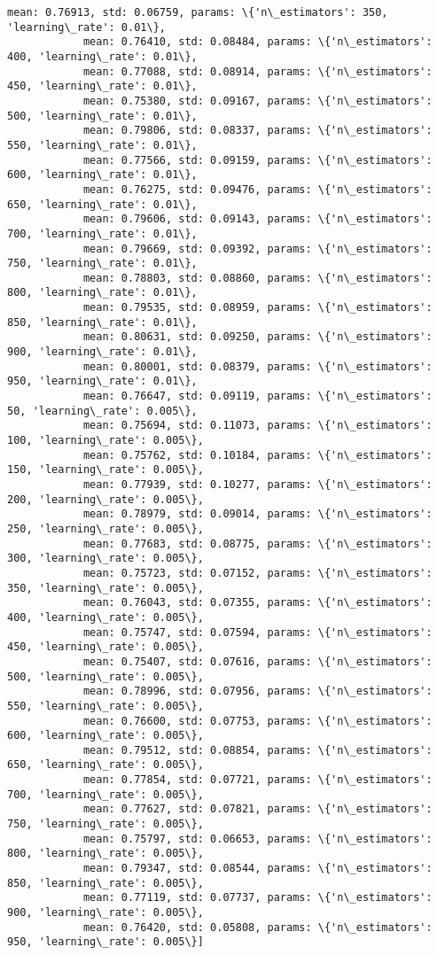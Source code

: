 \documentclass{article}
\begin{document}
\begin{Verbatim}[commandchars=\\\{\}]
            mean: 0.76913, std: 0.06759, params: \{'n\_estimators': 350, 'learning\_rate': 0.01\},
            mean: 0.76410, std: 0.08484, params: \{'n\_estimators': 400, 'learning\_rate': 0.01\},
            mean: 0.77088, std: 0.08914, params: \{'n\_estimators': 450, 'learning\_rate': 0.01\},
            mean: 0.75380, std: 0.09167, params: \{'n\_estimators': 500, 'learning\_rate': 0.01\},
            mean: 0.79806, std: 0.08337, params: \{'n\_estimators': 550, 'learning\_rate': 0.01\},
            mean: 0.77566, std: 0.09159, params: \{'n\_estimators': 600, 'learning\_rate': 0.01\},
            mean: 0.76275, std: 0.09476, params: \{'n\_estimators': 650, 'learning\_rate': 0.01\},
            mean: 0.79606, std: 0.09143, params: \{'n\_estimators': 700, 'learning\_rate': 0.01\},
            mean: 0.79669, std: 0.09392, params: \{'n\_estimators': 750, 'learning\_rate': 0.01\},
            mean: 0.78803, std: 0.08860, params: \{'n\_estimators': 800, 'learning\_rate': 0.01\},
            mean: 0.79535, std: 0.08959, params: \{'n\_estimators': 850, 'learning\_rate': 0.01\},
            mean: 0.80631, std: 0.09250, params: \{'n\_estimators': 900, 'learning\_rate': 0.01\},
            mean: 0.80001, std: 0.08379, params: \{'n\_estimators': 950, 'learning\_rate': 0.01\},
            mean: 0.76647, std: 0.09119, params: \{'n\_estimators': 50, 'learning\_rate': 0.005\},
            mean: 0.75694, std: 0.11073, params: \{'n\_estimators': 100, 'learning\_rate': 0.005\},
            mean: 0.75762, std: 0.10184, params: \{'n\_estimators': 150, 'learning\_rate': 0.005\},
            mean: 0.77939, std: 0.10277, params: \{'n\_estimators': 200, 'learning\_rate': 0.005\},
            mean: 0.78979, std: 0.09014, params: \{'n\_estimators': 250, 'learning\_rate': 0.005\},
            mean: 0.77683, std: 0.08775, params: \{'n\_estimators': 300, 'learning\_rate': 0.005\},
            mean: 0.75723, std: 0.07152, params: \{'n\_estimators': 350, 'learning\_rate': 0.005\},
            mean: 0.76043, std: 0.07355, params: \{'n\_estimators': 400, 'learning\_rate': 0.005\},
            mean: 0.75747, std: 0.07594, params: \{'n\_estimators': 450, 'learning\_rate': 0.005\},
            mean: 0.75407, std: 0.07616, params: \{'n\_estimators': 500, 'learning\_rate': 0.005\},
            mean: 0.78996, std: 0.07956, params: \{'n\_estimators': 550, 'learning\_rate': 0.005\},
            mean: 0.76600, std: 0.07753, params: \{'n\_estimators': 600, 'learning\_rate': 0.005\},
            mean: 0.79512, std: 0.08854, params: \{'n\_estimators': 650, 'learning\_rate': 0.005\},
            mean: 0.77854, std: 0.07721, params: \{'n\_estimators': 700, 'learning\_rate': 0.005\},
            mean: 0.77627, std: 0.07821, params: \{'n\_estimators': 750, 'learning\_rate': 0.005\},
            mean: 0.75797, std: 0.06653, params: \{'n\_estimators': 800, 'learning\_rate': 0.005\},
            mean: 0.79347, std: 0.08544, params: \{'n\_estimators': 850, 'learning\_rate': 0.005\},
            mean: 0.77119, std: 0.07737, params: \{'n\_estimators': 900, 'learning\_rate': 0.005\},
            mean: 0.76420, std: 0.05808, params: \{'n\_estimators': 950, 'learning\_rate': 0.005\}]
\end{Verbatim}
        
\end{document}
